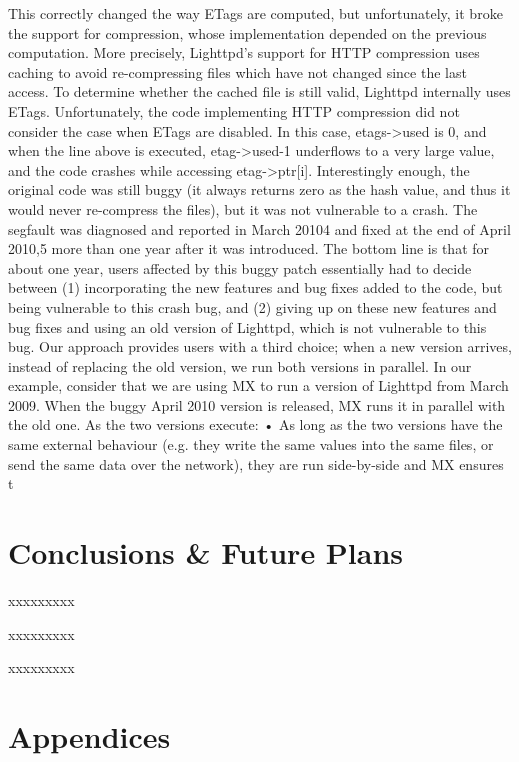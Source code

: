 \documentclass[a4paper,11pt,twoside]{report}
\begin{document}
This correctly changed the way ETags are computed, but
unfortunately, it broke the support for compression, whose
implementation depended on the previous computation. More
precisely, Lighttpd’s support for HTTP compression uses
caching to avoid re-compressing files which have not changed
since the last access. To determine whether the cached file
is still valid, Lighttpd internally uses ETags. Unfortunately,
the code implementing HTTP compression did not consider
the case when ETags are disabled. In this case, etags->used
is 0, and when the line above is executed, etag->used-1
underflows to a very large value, and the code crashes while
accessing etag->ptr[i]. Interestingly enough, the original
code was still buggy (it always returns zero as the hash value,
and thus it would never re-compress the files), but it was not
vulnerable to a crash.
The segfault was diagnosed and reported in March 20104
and
fixed at the end of April 2010,5 more than one year after it was
introduced. The bottom line is that for about one year, users
affected by this buggy patch essentially had to decide between
(1) incorporating the new features and bug fixes added to the
code, but being vulnerable to this crash bug, and (2) giving up
on these new features and bug fixes and using an old version
of Lighttpd, which is not vulnerable to this bug.
Our approach provides users with a third choice; when a
new version arrives, instead of replacing the old version, we
run both versions in parallel. In our example, consider that we
are using MX to run a version of Lighttpd from March 2009.
When the buggy April 2010 version is released, MX runs it in
parallel with the old one. As the two versions execute:
• As long as the two versions have the same external
behaviour (e.g. they write the same values into the same
files, or send the same data over the network), they are
run side-by-side and MX ensures t

\clearpage



\chapter{Conclusions \& Future Plans}
xxxxxxxxx\bigskip

xxxxxxxxx\bigskip

xxxxxxxxx\bigskip


\clearpage

\chapter{Appendices}
\end{document}
